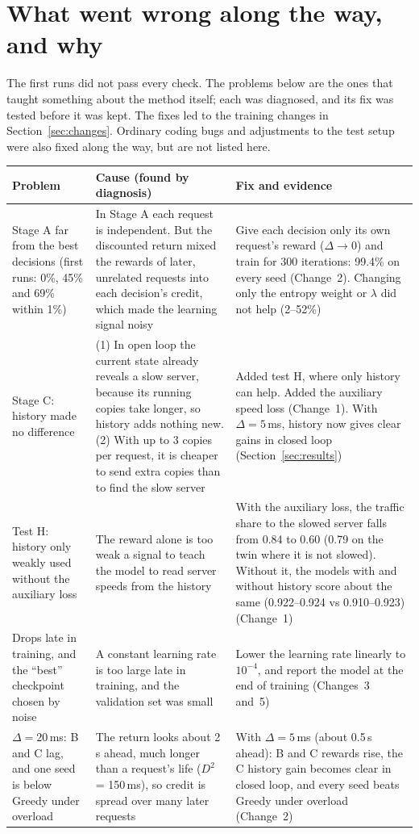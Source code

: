 \documentclass[10pt,a4paper]{article}
\newcommand{\hdr}[1]{\textsf{\textbf{#1}}}
\begin{document}
\section{What went wrong along the way, and why}\label{sec:failed}
The first runs did not pass every check. The problems below are the ones that taught something about the method itself; each was diagnosed, and its fix was tested before it was kept. The fixes led to the training changes in Section~\ref{sec:changes}. Ordinary coding bugs and adjustments to the test setup were also fixed along the way, but are not listed here.

\begingroup\small
\begin{tabularx}{\textwidth}{@{}P{3.6cm}LL@{}}
\toprule
\hdr{Problem} & \hdr{Cause (found by diagnosis)} & \hdr{Fix and evidence}\\\midrule
Stage A far from the best decisions (first runs: 0\%, 45\% and 69\% within 1\%) & In Stage A each request is independent. But the discounted return mixed the rewards of later, unrelated requests into each decision's credit, which made the learning signal noisy & Give each decision only its own request's reward ($\Delta\to0$) and train for 300 iterations: 99.4\% on every seed (Change~2). Changing only the entropy weight or $\lambda$ did not help (2--52\%)\\
Stage C: history made no difference & (1) In open loop the current state already reveals a slow server, because its running copies take longer, so history adds nothing new. (2) With up to 3 copies per request, it is cheaper to send extra copies than to find the slow server & Added test H, where only history can help. Added the auxiliary speed loss (Change~1). With $\Delta=5$\,ms, history now gives clear gains in closed loop (Section~\ref{sec:results})\\
Test H: history only weakly used without the auxiliary loss & The reward alone is too weak a signal to teach the model to read server speeds from the history & With the auxiliary loss, the traffic share to the slowed server falls from 0.84 to 0.60 (0.79 on the twin where it is not slowed). Without it, the models with and without history score about the same (0.922--0.924 vs 0.910--0.923) (Change~1)\\
Drops late in training, and the ``best'' checkpoint chosen by noise & A constant learning rate is too large late in training, and the validation set was small & Lower the learning rate linearly to $10^{-4}$, and report the model at the end of training (Changes~3 and~5)\\
$\Delta=20$\,ms: B and C lag, and one seed is below Greedy under overload & The return looks about 2\,s ahead, much longer than a request's life ($D^2$ = 150\,ms), so credit is spread over many later requests & With $\Delta=5$\,ms (about 0.5\,s ahead): B and C rewards rise, the C history gain becomes clear in closed loop, and every seed beats Greedy under overload (Change~2)\\
\bottomrule
\end{tabularx}
\endgroup
\end{document}
